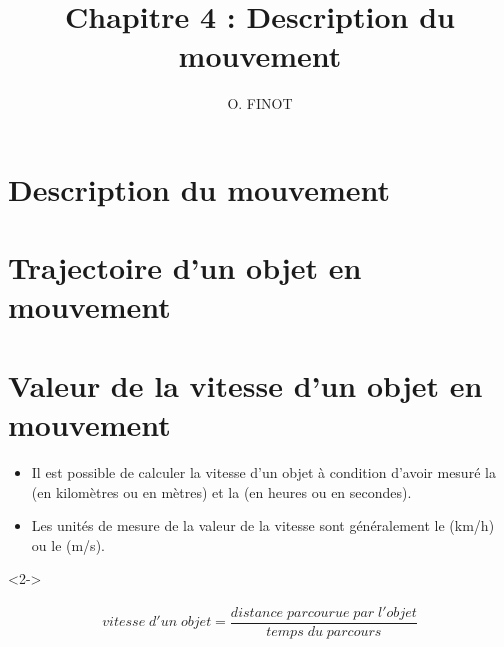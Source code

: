 \documentclass[xcolor={dvipsnames}]{beamer}
\title{Chapitre 4 : Description du mouvement}
\author{O. FINOT}\institute{Collège S$^t$ Bernard}
\begin{document}
\begin{frame}
  \titlepage 
\end{frame}


\section{Description du mouvement}

\begin{frame}
	
\end{frame}

\section{Trajectoire d'un objet en mouvement }

\begin{frame}
	
\end{frame}

\section{Valeur de la vitesse d'un objet en mouvement}

\begin{frame}




\begin{alertblock}{}
	\begin{itemize}
		\item Il est possible de calculer la vitesse d'un objet à condition d'avoir mesuré la  (en kilomètres ou en mètres) et la  (en heures ou en secondes). 
		
		\item Les unités de mesure de la valeur de la vitesse sont généralement le  (km/h) ou le  (m/s).
	\end{itemize}
	
	
	
\end{alertblock}

\begin{alertblock}<2->{}
	
	\begin{align*}
		vitesse\; d'un\; objet = \dfrac{distance \;  parcourue \; par \; l'objet}{temps \; du  \; parcours}
	\end{align*}
\end{alertblock}

\end{frame}
\end{document}
